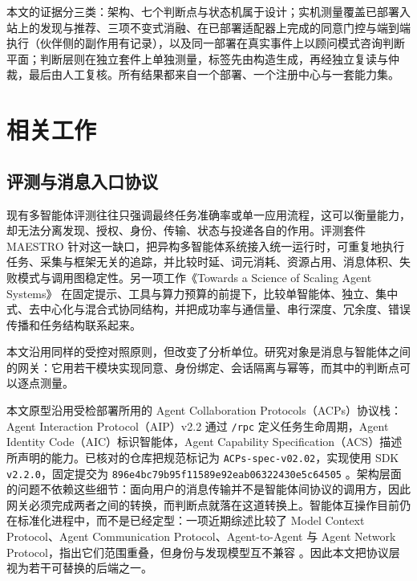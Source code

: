 \documentclass[11pt,a4paper]{article}
\begin{document}
本文的证据分三类：架构、七个判断点与状态机属于设计；实机测量覆盖已部署入站上的发现与推荐、三项不变式消融、在已部署适配器上完成的同意门控与端到端执行（伙伴侧的副作用有记录），以及同一部署在真实事件上以顾问模式咨询判断平面；判断层则在独立套件上单独测量，标签先由构造生成，再经独立复读与仲裁，最后由人工复核。所有结果都来自一个部署、一个注册中心与一套能力集。

\section{相关工作}

\subsection{评测与消息入口协议}

现有多智能体评测往往只强调最终任务准确率或单一应用流程，这可以衡量能力，却无法分离发现、授权、身份、传输、状态与投递各自的作用。评测套件 MAESTRO \cite{maestro2026} 针对这一缺口，把异构多智能体系统接入统一运行时，可重复地执行任务、采集与框架无关的追踪，并比较时延、词元消耗、资源占用、消息体积、失败模式与调用图稳定性。另一项工作《Towards a Science of Scaling Agent Systems》\cite{kim2026scaling} 在固定提示、工具与算力预算的前提下，比较单智能体、独立、集中式、去中心化与混合式协同结构，并把成功率与通信量、串行深度、冗余度、错误传播和任务结构联系起来。

本文沿用同样的受控对照原则，但改变了分析单位。研究对象是消息与智能体之间的网关：它用若干模块实现同意、身份绑定、会话隔离与幂等，而其中的判断点可以逐点测量。

本文原型沿用受检部署所用的 Agent Collaboration Protocols（ACPs）协议栈：Agent Interaction Protocol（AIP）v2.2 通过 \texttt{/\allowbreak{}rpc} 定义任务生命周期，Agent Identity Code（AIC）标识智能体，Agent Capability Specification（ACS）描述所声明的能力。已核对的仓库把规范标记为 \texttt{ACPs-spe\allowbreak{}c-v02.02}，实现使用 SDK \texttt{v2.2.0}，固定提交为 \texttt{896e4bc7\allowbreak{}9b95f115\allowbreak{}89e92eab\allowbreak{}06322430\allowbreak{}e5c64505} \cite{acps2026repo}。架构层面的问题不依赖这些细节：面向用户的消息传输并不是智能体间协议的调用方，因此网关必须完成两者之间的转换，而判断点就落在这道转换上。智能体互操作目前仍在标准化进程中，而不是已经定型：一项近期综述比较了 Model Context Protocol、Agent Communication Protocol、Agent-to-Agent 与 Agent Network Protocol，指出它们范围重叠，但身份与发现模型互不兼容 \cite{interop2025}。因此本文把协议层视为若干可替换的后端之一。
\end{document}
